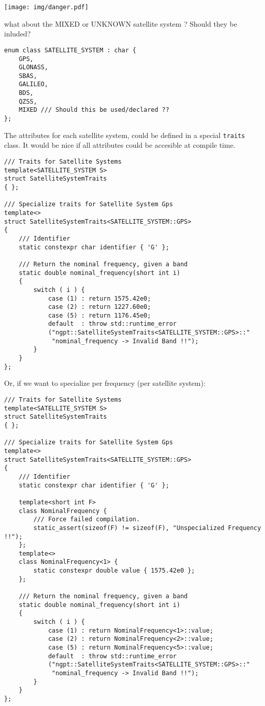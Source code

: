 \documentclass{article}
\newcommand{\alertwarningbox}[1]{
    \centering
    \colorbox{warningbackground}{\parbox{400pt} {
            \vskip 10pt
            \begin{floatingfigure}[l]{50pt}
                \texttt{[image: img/danger.pdf]}
            \end{floatingfigure}
            #1
            \vskip 10pt
        }
    }
}
\begin{document}
\alertwarningbox{what about the MIXED or UNKNOWN satellite system ? Should they be
inluded?}

\begin{lstlisting}
enum class SATELLITE_SYSTEM : char {
    GPS,
    GLONASS,
    SBAS,
    GALILEO,
    BDS,
    QZSS,
    MIXED /// Should this be used/declared ??
};
\end{lstlisting}

The attributes for each satellite system, could be defined in a special \texttt{traits} class.
It would be nice if all attributes could be accesible at compile time.
\begin{lstlisting}
/// Traits for Satellite Systems
template<SATELLITE_SYSTEM S>
struct SatelliteSystemTraits
{ };

/// Specialize traits for Satellite System Gps
template<>
struct SatelliteSystemTraits<SATELLITE_SYSTEM::GPS>
{
    /// Identifier
    static constexpr char identifier { 'G' };

    /// Return the nominal frequency, given a band
    static double nominal_frequency(short int i)
    {
        switch ( i ) {
            case (1) : return 1575.42e0;
            case (2) : return 1227.60e0;
            case (5) : return 1176.45e0;
            default  : throw std::runtime_error
            ("ngpt::SatelliteSystemTraits<SATELLITE_SYSTEM::GPS>::"
             "nominal_frequency -> Invalid Band !!");
        }
    }
};
\end{lstlisting}

Or, if we want to specialize per frequency (per satellite system): 
\begin{lstlisting}
/// Traits for Satellite Systems
template<SATELLITE_SYSTEM S>
struct SatelliteSystemTraits
{ };

/// Specialize traits for Satellite System Gps
template<>
struct SatelliteSystemTraits<SATELLITE_SYSTEM::GPS>
{
    /// Identifier
    static constexpr char identifier { 'G' };
    
    template<short int F>
    class NominalFrequency {
        /// Force failed compilation.
        static_assert(sizeof(F) != sizeof(F), "Unspecialized Frequency !!"); 
    };
    template<>
    class NominalFrequency<1> {
        static constexpr double value { 1575.42e0 };
    };
    
    /// Return the nominal frequency, given a band
    static double nominal_frequency(short int i)
    {
        switch ( i ) {
            case (1) : return NominalFrequency<1>::value;
            case (2) : return NominalFrequency<2>::value;
            case (5) : return NominalFrequency<5>::value;
            default  : throw std::runtime_error
            ("ngpt::SatelliteSystemTraits<SATELLITE_SYSTEM::GPS>::"
             "nominal_frequency -> Invalid Band !!");
        }
    }
};
\end{lstlisting}
\end{document}
